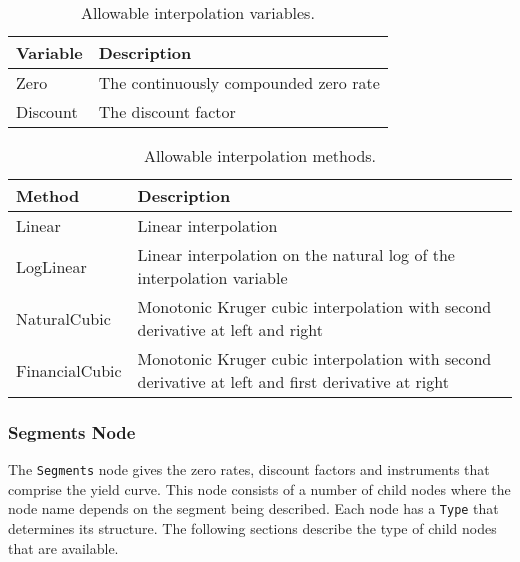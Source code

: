 \begin{table}[h]
\centering
  \begin{tabu} to 0.9\linewidth {| X[-1.5,l,m] | X[-5,l,m] |}
    \hline
    \bfseries{Variable} & \bfseries{Description} \\
    \hline
    Zero & The continuously compounded zero rate \\ \hline
    Discount & The discount factor \\ \hline
  \end{tabu}
  \caption{Allowable interpolation variables.}
  \label{tab:allow_interp_variables}
\end{table}

\begin{table}[h]
\centering
  \begin{tabu} to 0.9\linewidth {| X[-1.5,l,m] | X[-5,l,m] |}
    \hline
    \bfseries{Method} & \bfseries{Description} \\
    \hline
    Linear & Linear interpolation \\ \hline
    LogLinear & Linear interpolation on the natural log of the interpolation variable \\ \hline
    NaturalCubic & Monotonic Kruger cubic interpolation with second derivative at left and right \\ \hline
    FinancialCubic & Monotonic Kruger cubic interpolation with second derivative at left and 
                     first derivative at right \\ \hline
  \end{tabu}
  \caption{Allowable interpolation methods.}
  \label{tab:allow_interp_methods}
\end{table}
\subsubsection*{Segments Node} \label{ss:segments_node}
The \lstinline!Segments! node gives the zero rates, discount factors and instruments that comprise the yield curve. This 
node consists of a number of child nodes where the node name depends on the segment being described. Each node has a 
\lstinline!Type! that determines its structure. The following sections describe the type of child nodes that are 
available.

